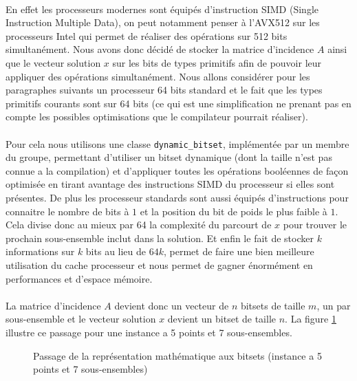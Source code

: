 \documentclass[12pt,letterpaper,twoside]{article}
\begin{document}
			\paragraph*{}
				En effet les processeurs modernes sont équipés d'instruction SIMD (Single Instruction Multiple Data), on peut notamment penser à l'AVX512 sur les processeurs Intel qui permet de réaliser des opérations sur 512 bits simultanément. Nous avons donc décidé de stocker la matrice d'incidence \(A\) ainsi que le vecteur solution \(x\) sur les bits de types primitifs \Cpp{} afin de pouvoir leur appliquer des opérations simultanément. Nous allons considérer pour les paragraphes suivants un processeur 64 bits standard et le fait que les types primitifs courants sont sur 64 bits (ce qui est une simplification ne prenant pas en compte les possibles optimisations que le compilateur pourrait réaliser).
			\paragraph*{}
				Pour cela nous utilisons une classe \texttt{dynamic\_bitset}\cite{dynamicbitset}, implémentée par un membre du groupe, permettant d'utiliser un bitset dynamique (dont la taille n'est pas connue a la compilation) et d'appliquer toutes les opérations booléennes de façon optimisée en tirant avantage des instructions SIMD du processeur si elles sont présentes. De plus les processeur standards sont aussi équipés d'instructions pour connaitre le nombre de bits à \(1\) et la position du bit de poids le plus faible à \(1\). Cela divise donc au mieux par 64 la complexité du parcourt de \(x\) pour trouver le prochain sous-ensemble inclut dans la solution. Et enfin le fait de stocker \(k\) informations sur \(k\) bits au lieu de \(64k\), permet de faire une bien meilleure utilisation du cache processeur et nous permet de gagner énormément en performances et d'espace mémoire.
			\paragraph*{}
				La matrice d'incidence \(A\) devient donc un vecteur de \(n\) bitsets de taille \(m\), un par sous-ensemble et le vecteur solution \(x\) devient un bitset de taille \(n\). La figure \ref{fig:representation_to_bitsets} illustre ce passage pour une instance a 5 points et 7 sous-ensembles.
			\begin{figure}[H]
				\centering%
				\resizebox{0.8\textwidth}{!}{}%
				\caption{Passage de la représentation mathématique aux bitsets (instance a 5 points et 7 sous-ensembles)}%
				\label{fig:representation_to_bitsets}%
			\end{figure}
\end{document}

